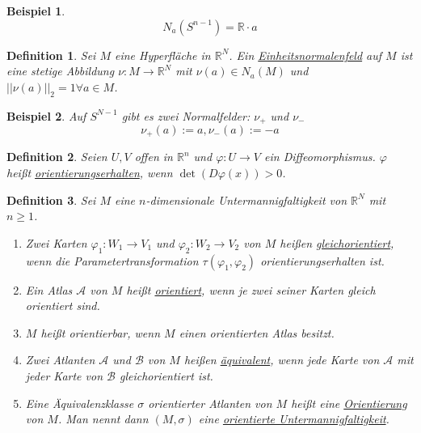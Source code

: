 \documentclass[10pt,a4paper]{report}
\newtheorem*{defi}{Definition}
\newtheorem*{example}{Beispiel}
\begin{document}
\begin{example}
  \begin{equation}
    N_{a}(S^{n - 1}) = \mathbb{R} \cdot a
  \end{equation}
\end{example}

\begin{defi}
  Sei $M$ eine Hyperfläche in $\mathbb{R}^{N}$.
  Ein \underline{Einheitsnormalenfeld} auf $M$ ist eine stetige Abbildung $\nu : M \rightarrow \mathbb{R}^{N}$ mit $\nu(a) \in N_{a}(M)$ und $||\nu(a)||_{2} = 1 \forall a \in M$.
\end{defi}

\begin{example}
  Auf $S^{N - 1}$ gibt es zwei Normalfelder: $\nu_{+}$ und $\nu_{-}$
  \begin{equation}
    \nu_{+}(a) := a, \nu_{-}(a) := -a
  \end{equation}
\end{example}

\begin{defi}
  Seien $U, V$ offen in $\mathbb{R}^{n}$ und $\varphi : U \rightarrow V$ ein Diffeomorphismus.
  $\varphi$ heißt \underline{orientierungserhalten}, wenn $\det(D\varphi(x)) > 0$.
\end{defi}

\begin{defi}
  Sei $M$ eine $n$-dimensionale Untermannigfaltigkeit von $\mathbb{R}^{N}$ mit $n \ge 1$.
  \begin{enumerate}[label={\alph*)}]
  \item Zwei Karten $\varphi_{1} : W_{1} \rightarrow V_{1}$ und $\varphi_{2} : W_{2} \rightarrow V_{2}$ von $M$ heißen \underline{gleichorientiert}, wenn die Parametertransformation $\tau(\varphi_{1}, \varphi_{2})$ orientierungserhalten ist.
  \item Ein Atlas $\mathscr{A}$ von $M$ heißt \underline{orientiert}, wenn je zwei seiner Karten gleich orientiert sind.
  \item $M$ heißt orientierbar, wenn $M$ einen orientierten Atlas besitzt.
  \item Zwei Atlanten $\mathscr{A}$ und $\mathscr{B}$ von $M$ heißen \underline{äquivalent}, wenn jede Karte von $\mathscr{A}$ mit jeder Karte von $\mathscr{B}$ gleichorientiert ist.
  \item Eine Äquivalenzklasse $\sigma$ orientierter Atlanten von $M$ heißt eine \underline{Orientierung} von $M$. Man nennt dann $(M, \sigma)$ eine \underline{orientierte Untermannigfaltigkeit}.
  \end{enumerate}
\end{defi}
\end{document}
